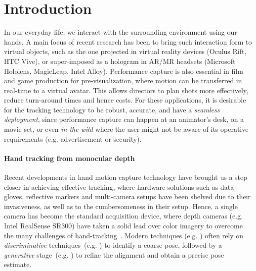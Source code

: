 \section{Introduction}
In our everyday life, we interact with the surrounding environment using our hands. A main focus of recent research has been to bring such interaction form to virtual objects, such as the one projected in virtual reality devices (Oculus Rift, HTC Vive), or super-imposed as a hologram in AR/MR headsets (Microsoft Hololens, MagicLeap, Intel Alloy). 
Performance capture is also essential in film and game production for pre-visualization, where motion can be transferred in real-time to a virtual avatar. This allows directors to plan shots more effectively, reduce turn-around times and hence costs.
For these applications, it is desirable for the tracking technology to be robust, accurate, and have a \emph{seamless deployment}, since performance capture can happen at an animator's desk, on a movie set, or even \emph{in-the-wild} where the user might not be aware of its operative requirements (e.g. advertisement or security).

\paragraph{Hand tracking from monocular depth}
Recent developments in hand motion capture technology have brought us a step closer in achieving effective tracking, where hardware solutions such as data-gloves, reflective markers and multi-camera setups have been shelved due to their invasiveness, as well as to the cumbersomeness in their setup.
Hence, a single camera has become the standard acquisition device, where depth cameras (e.g. Intel RealSense SR300) have taken a solid lead over color imagery to overcome the many challenges of hand-tracking~\cite{supancic2015depth}. 
Modern techniques (e.g. \cite{taylor2016joint}) often rely on \emph{discriminative} techniques~(e.g. \cite{valentin2016learning}) to identify a coarse pose, followed by a \emph{generative} stage~(e.g. \cite{tkach2016sphere}) to refine the alignment and obtain a precise pose estimate.


